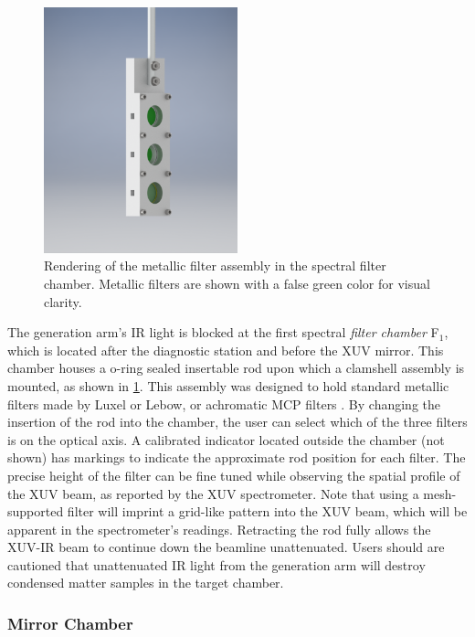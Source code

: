 \begin{figure}
	\centering
	\includegraphics[width=0.50\textwidth]{figures/chap2/filter_stick.png}
	\caption{Rendering of the metallic filter assembly in the spectral filter chamber. Metallic filters are shown with a false green color for visual clarity.}
	\label{fig:filter_stick}
\end{figure}

The generation arm's IR light is blocked at the first spectral \textit{filter chamber} F$_1$, which is located after the diagnostic station and before the XUV mirror. This chamber houses a o-ring sealed insertable rod upon which a clamshell assembly is mounted, as shown in \cref{fig:filter_stick}. This assembly was designed to hold standard metallic filters made by Luxel or Lebow, or achromatic MCP filters \cite{zhangSuppressionDrivingLaser2014}. By changing the insertion of the rod into the chamber, the user can select which of the three filters is on the optical axis. A calibrated indicator located outside the chamber (not shown) has markings to indicate the approximate rod position for each filter. The precise height of the filter can be fine tuned while observing the spatial profile of the XUV beam, as reported by the XUV spectrometer. Note that using a mesh-supported filter will imprint a grid-like pattern into the XUV beam, which will be apparent in the spectrometer's readings. Retracting the rod fully allows the XUV-IR beam to continue down the beamline unattenuated. Users should are cautioned that unattenuated IR light from the generation arm will destroy condensed matter samples in the target chamber.

\subsubsection{Mirror Chamber}

